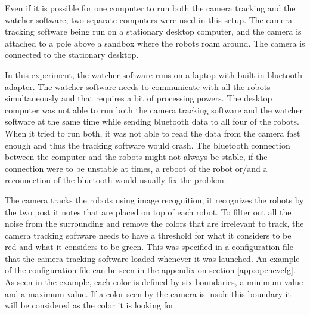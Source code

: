 Even if it is possible for one computer to run both the camera tracking and the watcher software, two separate computers were used in this setup. The camera tracking software being run on a stationary desktop computer, and the camera is attached to a pole above a sandbox where the robots roam around. The camera is connected to the stationary desktop. 

In this experiment, the watcher software runs on a laptop with built in bluetooth adapter. The watcher software needs to communicate with all the robots simultaneously and that requires a bit of processing powers.
The desktop computer was not able to run both the camera tracking software and the watcher software at the same time while sending bluetooth data to all four of the robots. When it tried to run both, it was not able to read the data from the camera fast enough and thus the tracking software would crash. The bluetooth connection between the computer and the robots might not always be stable, if the connection were to be unstable at times, a reboot of the robot or/and a reconnection of the bluetooth would usually fix the problem.

The camera tracks the robots using image recognition, it recognizes the robots by the two post it notes that are placed on top of each robot. 
To filter out all the noise from the surrounding and remove the colors that are irrelevant to track, the camera tracking software needs to have a threshold for what it considers to be red and what it considers to be green. This was specified in a configuration file that the camera tracking software loaded whenever it was launched. An example of the configuration file can be seen in the appendix on section \ref{app:opencvcfg}. As seen in the example, each color is defined by six boundaries, a minimum value and a maximum value. If a color seen by the camera is inside this boundary it will be considered as the color it is looking for.\clearpage


